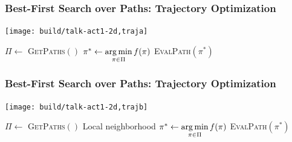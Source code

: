 \begin{frame}
\end{frame}

\begin{frame}
   \frametitle{Best-First Search over Paths: Trajectory Optimization}
   \begin{center}
      \texttt{[image: build/talk-act1-2d,traja]}
      
      \begin{minipage}{0.65\textwidth}
      \begin{algorithmic}
      \Loop
         \State $\Pi \leftarrow $ \textsc{GetPaths}$()$
            \Comment {}
         \State $\pi^* \leftarrow \operatorname*{arg\,min}\limits_{\pi \in \Pi} f(\pi)$
            \Comment {}
         \State \textsc{EvalPath}$(\pi^*)$
            \Comment {}
      \EndLoop
      \end{algorithmic}
      \end{minipage}
   \end{center}
\end{frame}

\begin{frame}
   \frametitle{Best-First Search over Paths: Trajectory Optimization}
   \begin{center}
      \texttt{[image: build/talk-act1-2d,trajb]}
      
      \begin{minipage}{0.8\textwidth}
      \begin{algorithmic}
      \Loop
         \State $\Pi \leftarrow $ \textsc{GetPaths}$()$
            \Comment Local neighborhood
         \State $\pi^* \leftarrow \operatorname*{arg\,min}\limits_{\pi \in \Pi} f(\pi)$
            \Comment {}
         \State \textsc{EvalPath}$(\pi^*)$
            \Comment {}
      \EndLoop
      \end{algorithmic}
      \end{minipage}
   \end{center}
\end{frame}

